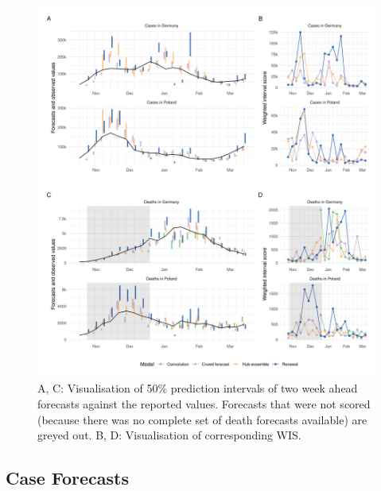 \documentclass[
]{article}
\begin{document}
\begin{figure}[H]
\includegraphics[width=1\linewidth,]{../analysis/plots/figure-forecasts-2} \caption{A, C: Visualisation of 50\% prediction intervals of two week ahead forecasts against the reported values. Forecasts that were not scored (because there was no complete set of death forecasts available) are greyed out. B, D: Visualisation of corresponding WIS.}\label{fig:forecasts-and-truth}
\end{figure}

\hypertarget{case-forecasts}{%
\subsection{Case Forecasts}\label{case-forecasts}}
\end{document}

